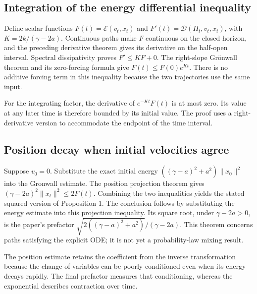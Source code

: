 \documentclass[11pt,a4paper]{report}
\begin{document}
\subsection{\texorpdfstring{Integration of the energy differential inequality}{Integration of the energy differential inequality}}
\label{report-step-KineticLangevin-Contraction-lean-5}


Define scalar functions \(F(t)=\mathcal E(v_t,x_t)\) and \(F'(t)=\mathcal D(H_t,v_t,x_t)\), with \(K=2k/(\gamma-2a)\). Continuous paths make \(F\) continuous on the closed horizon, and the preceding derivative theorem gives its derivative on the half-open interval. Spectral dissipativity proves \(F'\le KF+0\). The right-slope Grönwall theorem and its zero-forcing formula give \(F(t)\le F(0)e^{Kt}\). There is no additive forcing term in this inequality because the two trajectories use the same input.



For the integrating factor, the derivative of \(e^{-Kt}F(t)\) is at most zero. Its value at any later time is therefore bounded by its initial value. The proof uses a right-derivative version to accommodate the endpoint of the time interval.

\subsection{\texorpdfstring{Position decay when initial velocities agree}{Position decay when initial velocities agree}}
\label{report-step-KineticLangevin-Contraction-lean-6}


Suppose \(v_0=0\). Substitute the exact initial energy \(((\gamma-a)^2+a^2)\|x_0\|^2\) into the Gronwall estimate. The position projection theorem gives \((\gamma-2a)^2\|x_t\|^2\le2F(t)\). Combining the two inequalities yields the stated squared version of Proposition 1. The conclusion follows by substituting the energy estimate into this projection inequality. Its square root, under \(\gamma-2a>0\), is the paper's prefactor \(\sqrt{2((\gamma-a)^2+a^2)}/(\gamma-2a)\). This theorem concerns paths satisfying the explicit ODE; it is not yet a probability-law mixing result.



The position estimate retains the coefficient from the inverse transformation because the change of variables can be poorly conditioned even when its energy decays rapidly. The final prefactor measures that conditioning, whereas the exponential describes contraction over time.
\end{document}
